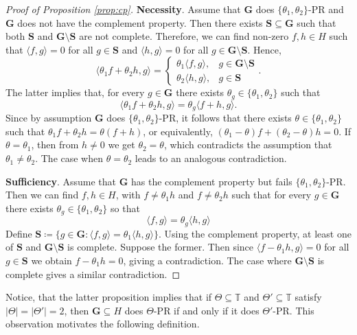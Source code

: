 \documentclass[reqno,a4paper,11pt]{amsart}
\numberwithin{equation}{section}
\def\T{{\mathbb T}}
\newcommand\1{\mathds{1}}
\begin{document}
\begin{proof}[Proof of Proposition \ref{prop:cp}]
    \textbf{Necessity}. Assume that $\mathbf{G}$ does $\{\theta_1,\theta_2\}$-PR and $\mathbf{G}$ does not have the complement property. Then there exists $\mathbf{S} \subseteq \mathbf{G}$ such that both $\mathbf{S}$ and $\mathbf{G} \setminus \mathbf{S}$ are not complete. Therefore, we can find non-zero $f,h \in H$ such that $\langle f,g\rangle =0$ for all $g\in \mathbf{S}$ and $\langle h,g\rangle =0$ for all $g\in \mathbf{G\setminus S}$. Hence,
    $$
    \langle \theta_1 f+\theta_2 h, g\rangle =\begin{cases} 
      \theta_1\langle f,g\rangle, & g\in \mathbf{G\setminus S} \\
      \theta_2\langle h,g\rangle, & g\in \mathbf{S} 
   \end{cases}.
    $$
    The latter implies that, for every $g \in \mathbf{G}$ there exists $\theta_g \in\{\theta_1,\theta_2\}$ such that
    \begin{equation}
        \langle \theta_1 f+\theta_2 h, g\rangle  = \theta_g \langle f+h, g\rangle.
    \end{equation}
    Since by assumption $\mathbf{G}$ does $\{\theta_1,\theta_2\}$-PR, it follows that there exists $\theta\in \{\theta_1,\theta_2\}$ such that  $\theta_1 f+\theta_2 h = \theta(f+h)$, or equivalently, $(\theta_1-\theta)f + (\theta_2-\theta)h=0$. If $\theta=\theta_1$, then from $h\neq 0$ we get $\theta_2=\theta$, which contradicts the assumption that $\theta_1 \neq \theta_2$. 
    The case when $\theta = \theta_2$ leads to an analogous contradiction.

    \textbf{Sufficiency}. Assume that $\mathbf{G}$ has the complement property but fails $\{\theta_1,\theta_2\}$-PR. Then we can find $f,h\in H$, with $f\neq \theta_1h$ and $f\neq \theta_2h$ such that for every $g\in \mathbf{G}$ there exists $\theta_g \in \{\theta_1,\theta_2\}$ so that
    $$
    \langle f,g\rangle = \theta_g\langle h,g\rangle
    $$
    Define $\mathbf{S} \coloneqq \{g\in \mathbf{G}: \langle f,g\rangle=\theta_1\langle h,g\rangle\}$. Using the complement property, at least one of $\mathbf{S}$ and $\mathbf{G\setminus S}$ is complete. Suppose the former. Then since $\langle f-\theta_1 h, g\rangle =0$ for all $g\in \mathbf{S}$ we obtain $f-\theta_1 h=0$, giving a contradiction. The case where $\mathbf{G\setminus S}$ is complete gives a similar contradiction.
\end{proof}

Notice, that the latter proposition implies that if $\Theta \subseteq \T$ and $\Theta' \subseteq \T$ satisfy $|\Theta| = |\Theta'|=2$, then $\mathbf{G} \subseteq H$ does $\Theta$-PR if and only if it does $\Theta'$-PR. This observation motivates the following definition.
\end{document}
